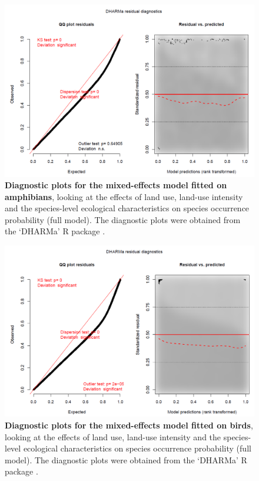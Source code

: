 \documentclass[11pt]{article}
\begin{document}
\begin{figure}[h!]
\centering
\includegraphics[scale=0.45]{Figures/LU_Diag_amphibians.png}
\caption[Land-use responses: diagnostic plots for the mixed-effects model fitted on amphibians]{\textbf{Diagnostic plots for the mixed-effects model fitted on amphibians}, looking at the effects of land use, land-use intensity and the species-level ecological characteristics on species occurrence probability (full model). The diagnostic plots were obtained from the `DHARMa' R package \citep{DHARMa}.}
\label{SI_4_Figure12}
\end{figure}

\begin{figure}[h!]
\centering
\includegraphics[scale=0.45]{Figures/LU_Diag_birds.png}
\caption[Land-use responses: diagnostic plots for the mixed-effects model fitted on birds]{\textbf{Diagnostic plots for the mixed-effects model fitted on birds}, looking at the effects of land use, land-use intensity and the species-level ecological characteristics on species occurrence probability (full model). The diagnostic plots were obtained from the `DHARMa' R package \citep{DHARMa}.}
\label{SI_4_Figure13}
\end{figure}
\end{document}
